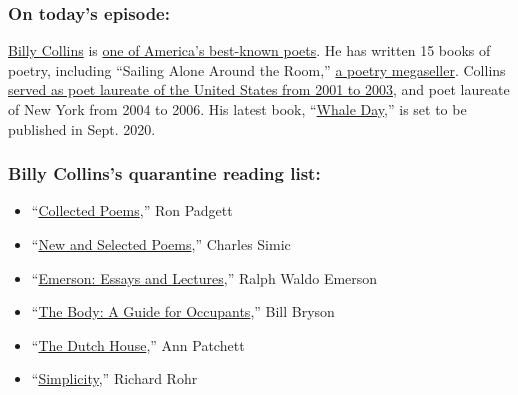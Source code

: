 \hypertarget{on-todays-episode}{%
\subsubsection{\texorpdfstring{\textbf{On today's
episode:}}{On today's episode:}}\label{on-todays-episode}}

\href{https://www.poetryfoundation.org/poets/billy-collins}{Billy
Collins} is
\href{https://www.nytimes3xbfgragh.onion/2004/10/07/books/poetry-starts-to-wear-100-million-crown.html}{one
of America's best-known poets}. He has written 15 books of poetry,
including ``Sailing Alone Around the Room,''
\href{https://www.nytimes3xbfgragh.onion/2001/11/18/nyregion/citypeople-the-selling-of-billy-collins.html}{a
poetry megaseller}. Collins
\href{https://www.nytimes3xbfgragh.onion/2013/11/17/opinion/sunday/billy-collins.html}{served
as poet laureate of the United States from 2001 to 2003}, and poet
laureate of New York from 2004 to 2006. His latest book,
``\href{https://www.penguinrandomhouse.com/books/547113/whale-day-by-billy-collins/}{Whale
Day},'' is set to be published in Sept. 2020.

\hypertarget{billy-collinss-quarantine-reading-list}{%
\subsubsection{\texorpdfstring{\textbf{Billy Collins's quarantine
reading
list:}}{Billy Collins's quarantine reading list:}}\label{billy-collinss-quarantine-reading-list}}

\begin{itemize}
\item
  ``\href{https://www.indiebound.org/book/9781566893428}{Collected
  Poems},'' Ron Padgett
\item
  ``\href{https://www.indiebound.org/book/9780547928289?aff=NPR}{New and
  Selected Poems},'' Charles Simic
\item
  ``\href{https://www.indiebound.org/book/9780940450158}{Emerson: Essays
  and Lectures},'' Ralph Waldo Emerson
\item
  ``\href{https://www.indiebound.org/book/9780385539302}{The Body: A
  Guide for Occupants},'' Bill Bryson
\item
  ``\href{https://www.indiebound.org/book/9780062963673}{The Dutch
  House},'' Ann Patchett
\item
  ``\href{https://www.indiebound.org/book/9780824521158}{Simplicity},''
  Richard Rohr
\end{itemize}

